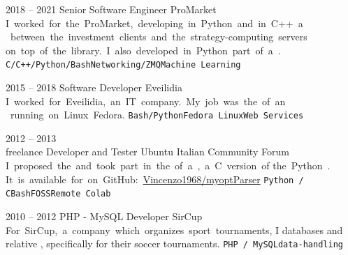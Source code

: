 \documentclass[9pt]{developercv} %
\newcommand{\myHilight}[2]{\tcbtp{\textit{\color{#1}{#2}}}}
\begin{document}
\begin{entrylist}
	\entry
	    {2018 -- 2021}
	    {Senior Software Engineer}
	    {ProMarket}
	    {\mbox{I worked for the \myHilight{textcolor}{fintech startup} ProMarket, 
        developing in Python and in C++ a \myHilight{textcolor}{networking}} 
        \linebreak 
        \mbox{\myHilight{textcolor}{framework} between the investment clients 
        and the strategy-computing servers}
        \linebreak{}
        \mbox{on top of the \myHilight{textcolor}{ZeroMq} library. 
        I also developed in Python part of a \myHilight{textcolor}{sentiment analysis engine}.}
        \linebreak{}
        \texttt{C/C++/Python/Bash}\slashsep\texttt{Networking/ZMQ}\slashsep\texttt{Machine Learning}}

	\entry
		{2015 -- 2018} %
		{Software Developer}
		{Eveilidia}
        {\mbox{I worked for Eveilidia, an IT company. My job was the 
        \myHilight{textcolor}{debugging and maintaining} of an} 
        \linebreak  
        \mbox{\myHilight{textcolor}{on-demand book-publisher websites’ back-end} running on Linux Fedora.}
        \linebreak{}    
        \texttt{Bash/Python}\slashsep\texttt{Fedora Linux}\slashsep\texttt{Web Services}}

	\entry
		{2012 -- 2013\\\footnotesize{freelance}}
		{Developer and Tester}
		{Ubuntu Italian Community Forum}
        {\mbox{I proposed the \myHilight{textcolor}{idea} and took part in the 
        \myHilight{textcolor}{development} of a \myHilight{textcolor}{command line parser}, 
        a C version of}
        \linebreak{}
        \mbox{the Python \myHilight{textcolor}{argparse module}.} 
        \linebreak{}
        \mbox{It is available for \myHilight{textcolor}{free download and use} 
        on GitHub: \href{https://github.com/Vincenzo1968/myoptParser}{Vincenzo1968/myoptParser}}
        \linebreak{}
        \texttt{Python / C}\slashsep\texttt{Bash}\slashsep\texttt{FOSS}\slashsep\texttt{Remote Colab}}

	\entry
		{2010 -- 2012} %
		{PHP - MySQL Developer}
		{SirCup}
		{\mbox{For SirCup, a company which organizes sport 
        tournaments,} I \myHilight{textcolor}{developed and maintained MySQL} databases 
        and relative \myHilight{textcolor}{data-handling and presentation PHP routines}, 
        specifically for their soccer tournaments.
        \linebreak{}
        \texttt{PHP / MySQL}\slashsep\texttt{data-handling}}


\end{entrylist}
\end{document}
